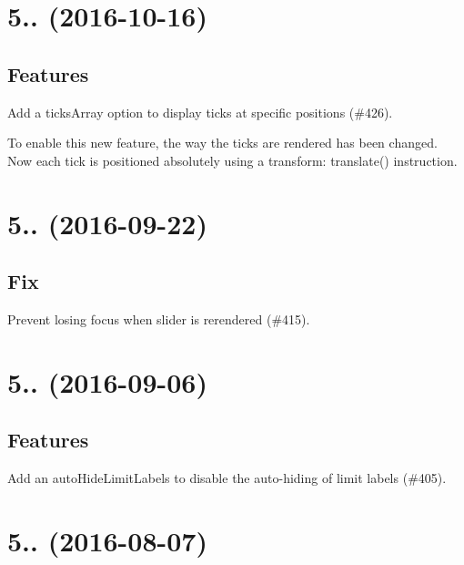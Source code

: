 \section*{5.. (2016-\/10-\/16)}

\subsection*{Features}


\begin{DoxyItemize}
\item Add a {\ttfamily ticks\+Array} option to display ticks at specific positions (\#426).
\end{DoxyItemize}

To enable this new feature, the way the ticks are rendered has been changed. Now each tick is positioned absolutely using a {\ttfamily transform\+: translate()} instruction.

\section*{5.. (2016-\/09-\/22)}

\subsection*{Fix}


\begin{DoxyItemize}
\item Prevent losing focus when slider is rerendered (\#415).
\end{DoxyItemize}

\section*{5.. (2016-\/09-\/06)}

\subsection*{Features}


\begin{DoxyItemize}
\item Add an {\ttfamily auto\+Hide\+Limit\+Labels} to disable the auto-\/hiding of limit labels (\#405).
\end{DoxyItemize}

\section*{5.. (2016-\/08-\/07)}

